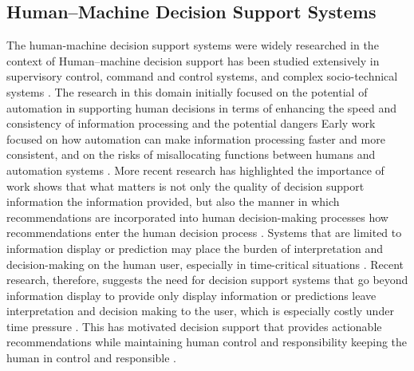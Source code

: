 \documentclass[journal]{IEEEtran}
\theoremstyle{plain}
\theoremstyle{definition}
\providecommand{\DIFaddtex}[1]{{\protect\color{blue} \sf #1}} %
\providecommand{\DIFdeltex}[1]{{\protect\color{red} \scriptsize #1}} %
\providecommand{\DIFaddbegin}{} %
\providecommand{\DIFaddend}{} %
\providecommand{\DIFdelbegin}{} %
\providecommand{\DIFdelend}{} %
\providecommand{\DIFadd}[1]{\texorpdfstring{\DIFaddtex{#1}}{#1}} %
\providecommand{\DIFdel}[1]{\texorpdfstring{\DIFdeltex{#1}}{}} %
\newcommand{\DIFscaledelfig}{0.5}
\newlength{\DIFdelgraphicswidth} %
\newlength{\DIFdelgraphicsheight} %
\newcommand{\DIFaddincludegraphics}[2][]{{\color{blue}\fbox{\DIFOincludegraphics[#1]{#2}}}} %
\newcommand{\DIFdelincludegraphics}[2][]{%
\sbox{\DIFdelgraphicsbox}{\DIFOincludegraphics[#1]{#2}}%
\settoboxwidth{\DIFdelgraphicswidth}{\DIFdelgraphicsbox} %
\settoboxtotalheight{\DIFdelgraphicsheight}{\DIFdelgraphicsbox} %
\scalebox{\DIFscaledelfig}{%
\parbox[b]{\DIFdelgraphicswidth}{\usebox{\DIFdelgraphicsbox}\\[-\baselineskip] \rule{\DIFdelgraphicswidth}{0em}}\llap{\resizebox{\DIFdelgraphicswidth}{\DIFdelgraphicsheight}{%
\setlength{\unitlength}{\DIFdelgraphicswidth}%
\begin{picture}(1,1)%
\thicklines\linethickness{2pt} %
{\color[rgb]{1,0,0}\put(0,0){\framebox(1,1){}}}%
{\color[rgb]{1,0,0}\put(0,0){\line( 1,1){1}}}%
{\color[rgb]{1,0,0}\put(0,1){\line(1,-1){1}}}%
\end{picture}%
}\hspace*{3pt}}} %
} %
\DeclareRobustCommand{\DIFaddbegin}{\DIFOaddbegin \let\includegraphics\DIFaddincludegraphics} %
\DeclareRobustCommand{\DIFaddend}{\DIFOaddend \let\includegraphics\DIFOincludegraphics} %
\DeclareRobustCommand{\DIFdelbegin}{\DIFOdelbegin \let\includegraphics\DIFdelincludegraphics} %
\DeclareRobustCommand{\DIFdelend}{\DIFOaddend \let\includegraphics\DIFOincludegraphics} %
\begin{document}
\subsection{Human--Machine Decision Support Systems}
\DIFdelbegin \DIFdel{The human-machine decision support systems were widely researched in the context of }\DIFdelend \DIFaddbegin \DIFadd{Human--machine decision support has been studied extensively in }\DIFaddend supervisory control, command and control\DIFdelbegin \DIFdel{systems}\DIFdelend , and complex socio-technical systems \cite{Hodgson2013THMS,Yang2022THMSReview,Bach2024Access}. \DIFdelbegin \DIFdel{The research in this domain initially focused on the potential of automation in supporting human decisions in terms of enhancing the speed and consistency of information processing and the potential dangers }\DIFdelend \DIFaddbegin \DIFadd{Early work focused on how automation can make information processing faster and more consistent, and on the risks }\DIFaddend of misallocating functions between humans and automation \DIFdelbegin \DIFdel{systems }\DIFdelend \cite{Hodgson2013THMS,Zhang2022THMS}.
More recent \DIFdelbegin \DIFdel{research has highlighted the importance of }\DIFdelend \DIFaddbegin \DIFadd{work shows that what matters is }\DIFaddend not only the quality of \DIFdelbegin \DIFdel{decision support information }\DIFdelend \DIFaddbegin \DIFadd{the information provided}\DIFaddend , but also \DIFdelbegin \DIFdel{the manner in which recommendations are incorporated into human decision-making processes }\DIFdelend \DIFaddbegin \DIFadd{how recommendations enter the human decision process }\DIFaddend \cite{Lai2023FAccT,Muller2022CHIWORK}. Systems that \DIFdelbegin \DIFdel{are limited to information display or prediction may place the burden of interpretation and decision-making on the human user, especially in time-critical situations \cite{Bach2024Access,PerezCerrolaza2024CSUR}. Recent research, therefore, suggests the need for decision support systems that go beyond information display to provide }\DIFdelend \DIFaddbegin \DIFadd{only display information or predictions leave interpretation and decision making to the user, which is especially costly under time pressure \cite{Bach2024Access,PerezCerrolaza2024CSUR}. This has motivated decision support that provides }\DIFaddend actionable recommendations while \DIFdelbegin \DIFdel{maintaining human control and responsibility }\DIFdelend \DIFaddbegin \DIFadd{keeping the human in control and responsible }\DIFaddend \cite{Assaad2023TAS,Yang2022THMSReview}.
\end{document}
